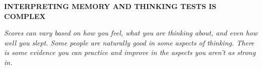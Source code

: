 \begin{center}
    \textbf{INTERPRETING MEMORY AND THINKING TESTS IS COMPLEX}

    \textit{Scores can vary based on how you feel, what you are thinking about, and even how well you slept. Some people are naturally good in some aspects of thinking. There is some evidence you can practice and improve in the aspects you aren’t as strong in.}    
\end{center}
